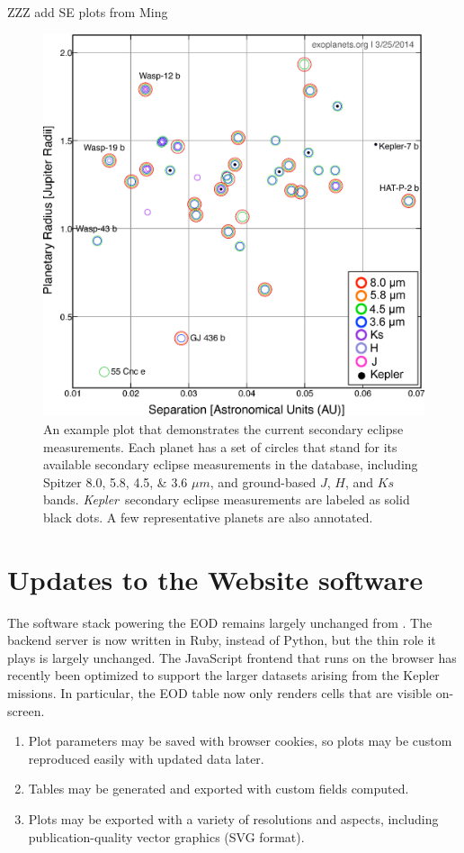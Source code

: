 \documentclass[11pt,preprint]{aastex}
\def\kepler{\textit{Kepler}}
\begin{document}
\begin{CJK*}{UTF8}{gbsn}
ZZZ add SE plots from Ming

\begin{figure}[!htb]
\centering
\includegraphics[width=\textwidth]{../fig/senew.eps}
\caption{An example plot that demonstrates the current secondary eclipse measurements. Each planet has a set of circles that stand for its available secondary eclipse measurements in the database, including Spitzer 8.0, 5.8, 4.5, \& 3.6 $\mu m$, and  ground-based $J$, $H$, and $Ks$ bands. \kepler\ secondary eclipse measurements are labeled as solid black dots. A few representative planets are also annotated.}
\label{fig:se}
\end{figure}


\section{Updates to the Website software}\label{sec:website}

The software stack powering the EOD remains largely unchanged from
\cite{Wright2011}. The backend server is now written in Ruby, instead
of Python, but the thin role it plays is largely unchanged.  The
JavaScript frontend that runs on the browser has recently been
optimized to support the larger datasets arising from the Kepler
missions.  In particular, the EOD table now only renders cells that
are visible on-screen. 
\begin{enumerate}
\item Plot parameters may be saved with browser cookies, so plots may be custom reproduced easily with updated data later.
\item Tables may be generated and exported with custom fields computed.
\item Plots may be exported with a variety of resolutions and aspects, including publication-quality vector graphics (SVG format). 
\end{enumerate}


\end{CJK*}
\end{document}

